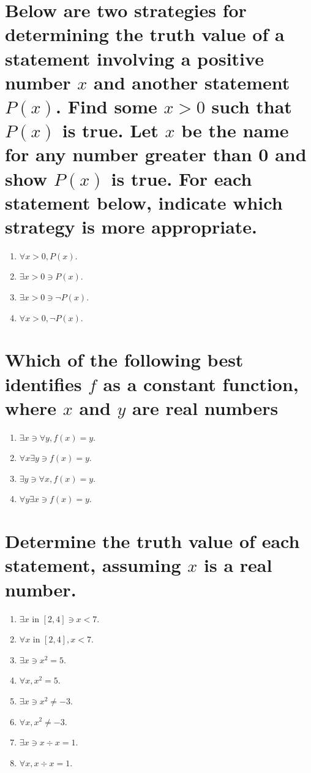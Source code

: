 \documentclass[11pt]{article} %
\begin{document}
\section{Below are two strategies for determining the truth value of a statement involving a positive number $x$ and another statement $P(x)$.
Find some $x>0$ such that $P(x)$ is true.
Let $x$ be the name for any number greater than 0 and show $P(x)$ is true.
For each statement below, indicate which strategy is more appropriate.}
\begin{enumerate}
\item $\forall x>0, P(x)$.
\item $\exists x>0 \ni P(x)$.
\item $\exists x>0 \ni \neg P(x)$.
\item $\forall x>0, \neg P(x)$.
\end{enumerate}

\section{Which of the following best identifies $f$ as a constant function, where $x$ and $y$ are real numbers}
\begin{enumerate}
\item $\exists x \ni \forall y, f(x)=y$.
\item $\forall x \exists y \ni f(x) = y$.
\item $\exists y \ni \forall x, f(x) = y$.
\item $\forall y \exists x \ni f(x) = y$.
\end{enumerate}

\section{Determine the truth value of each statement, assuming $x$ is a real number.}
\begin{enumerate}
\item $\exists x$ in $\left[ 2,4 \right] \ni x<7$.
\item $\forall x$ in $\left[ 2,4 \right], x<7$.
\item $\exists x \ni x^2=5$.
\item $\forall x, x^2=5$.
\item $\exists x \ni x^2 \neq -3$.
\item $\forall x, x^2 \neq -3$.
\item $\exists x \ni x \div x = 1$.
\item $\forall x, x \div x = 1$.
\end{enumerate}
\end{document}
